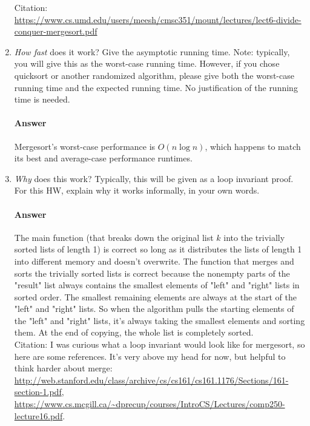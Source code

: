 \documentclass{article}
\begin{document}
\begin{enumerate}
Citation: \url{https://www.cs.umd.edu/users/meesh/cmsc351/mount/lectures/lect6-divide-conquer-mergesort.pdf}

    \item \emph{How fast} does it work?  Give the asymptotic running time.
        Note: typically, you will give this as the worst-case running time.
        However, if you chose quicksort or another randomized algorithm, please
        give both the worst-case running time and the expected running time.  No
        justification of the running time is needed.

        \paragraph{Answer}{Mergesort's worst-case performance is $O(n\log{}n)$, which happens to match its best and average-case performance runtimes.}

    \item \emph{Why} does this work? Typically, this will be given as a loop
        invariant proof.  For this HW, explain why it works informally, in your
        own words.

        \paragraph{Answer}{The main function (that breaks down the original list $k$ into the trivially sorted lists of length 1) is correct so long as it distributes the lists of length 1 into different memory and doesn't overwrite. The function that merges and sorts the trivially sorted lists is correct because the nonempty parts of the "result" list always contains the smallest elements of "left" and "right" lists in sorted order. The smallest remaining elements are always at the start of the "left" and "right" lists. So when the algorithm pulls the starting elements of the "left" and "right" lists, it's always taking the smallest elements and sorting them. At the end of copying, the whole list is completely sorted.}
\\Citation: I was curious what a loop invariant would look like for mergesort, so here are some references. It's very above my head for now, but helpful to think harder about merge: \url{http://web.stanford.edu/class/archive/cs/cs161/cs161.1176/Sections/161-section-1.pdf}, \url{https://www.cs.mcgill.ca/~dprecup/courses/IntroCS/Lectures/comp250-lecture16.pdf}.

\end{enumerate}
\end{document}
